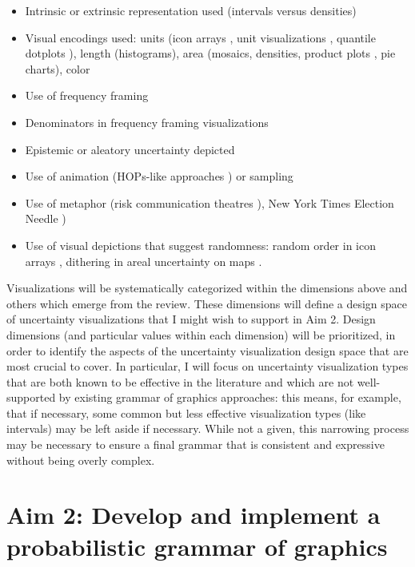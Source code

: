 \documentclass[11pt]{article}
\begin{document}
\vspace{-0.75em}
\begin{itemize}[noitemsep]
  \item Intrinsic or extrinsic representation used (\eg intervals versus densities)
  \item Visual encodings used: 
    units (\eg icon arrays \cite{Ancker2006}, unit visualizations \cite{Park2017}, quantile dotplots \cite{kay2016bus,Fernandes2018}), length (histograms), area (mosaics, densities, product plots \cite{wickham_product_2011}, pie charts), color \cite{lucchesi_visualizing_2017, Correll2018}
  \item Use of frequency framing
  \item Denominators in frequency framing visualizations \cite{Ancker2006}
  \item Epistemic or aleatory uncertainty depicted \cite{OHagan2006uncertain}
  \item Use of animation (\eg HOPs-like approaches \cite{hullman2015hops, kale2018hypothetical}) or sampling
  \item Use of metaphor (\eg risk communication theatres \cite{Rifkin2007risk_theatre}), New York Times Election Needle \cite{gregor_aisch_live_2016})
  \item Use of visual depictions that suggest randomness: \eg random order in icon arrays \cite{Ancker2006}, dithering in areal uncertainty on maps \cite{lucchesi_visualizing_2017}.
\end{itemize}

Visualizations will be systematically categorized within the dimensions above and others which emerge from the review. These dimensions will define a design space of uncertainty visualizations that I might wish to support in Aim 2. Design dimensions (and particular values within each dimension) will be prioritized, in order to identify the aspects of the uncertainty visualization design space that are most crucial to cover. In particular, I will focus on uncertainty visualization types that are both known to be effective in the literature and which are not well-supported by existing grammar of graphics approaches: this means, for example, that if necessary, some common but less effective visualization types (like intervals) may be left aside if necessary. While not a given, this narrowing process may be necessary to ensure a final grammar that is consistent and expressive without being overly complex.

\section{Aim 2: Develop and implement a probabilistic grammar of graphics}
\end{document}
